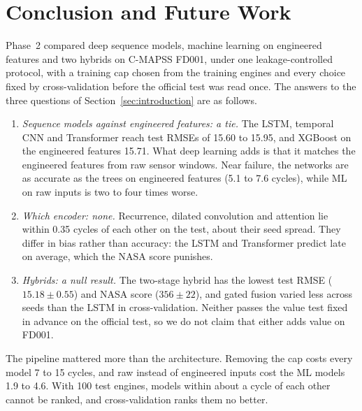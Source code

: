 
\section{Conclusion and Future Work}
\label{sec:conclusion}

Phase~2 compared deep sequence models, machine learning on engineered
features and two hybrids on C-MAPSS FD001, under one leakage-controlled
protocol, with a training cap chosen from the training engines and every
choice fixed by cross-validation before the official test was read once. The
answers to the three questions of Section~\ref{sec:introduction} are as
follows.
\begin{enumerate}
\item \emph{Sequence models against engineered features: a tie.} The LSTM,
temporal CNN and Transformer reach test RMSEs of 15.60 to 15.95, and XGBoost on
the engineered features 15.71. What deep learning adds is that it matches the
engineered features from raw sensor windows. Near failure, the networks are as
accurate as the trees on engineered features (5.1 to 7.6 cycles), while ML on
raw inputs is two to four times worse.
\item \emph{Which encoder: none.} Recurrence, dilated convolution and
attention lie within 0.35 cycles of each other on the test, about their seed
spread. They differ in bias rather than accuracy: the LSTM and Transformer
predict late on average, which the NASA score punishes.
\item \emph{Hybrids: a null result.} The two-stage hybrid has the lowest test
RMSE ($15.18\pm0.55$) and NASA score ($356\pm22$), and gated fusion varied less
across seeds than the LSTM in cross-validation. Neither passes the value test
fixed in advance on the official test, so we do not claim that either adds
value on FD001.
\end{enumerate}
The pipeline mattered more than the architecture. Removing the cap costs every
model 7 to 15 cycles, and raw instead of engineered inputs cost the ML models
1.9 to 4.6. With 100 test engines, models within about a cycle of each other
cannot be ranked, and cross-validation ranks them no better.

